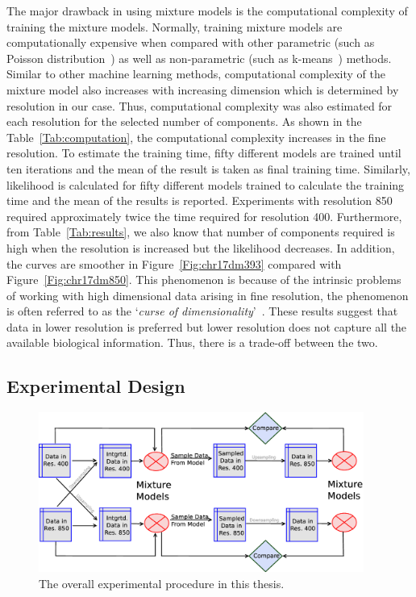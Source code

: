 The major drawback in using mixture models is the computational complexity of training the mixture models. Normally, training mixture models are computationally expensive when compared with other parametric (such as Poisson distribution~\cite{poission}) as well as non-parametric (such as k-means~\cite{kmeans, kmeans2}) methods. Similar to other machine learning methods, computational complexity of the mixture model also increases with increasing dimension which is determined by resolution in our case. Thus, computational complexity was also estimated for each resolution for the selected number of components. As shown in the Table~\ref{Tab:computation}, the computational complexity increases in the fine resolution. To estimate the training time, fifty different models are trained until ten iterations and the mean of the result is taken as final training time. Similarly, likelihood is calculated for fifty different models trained to calculate the training time and the mean of the results is reported. Experiments with resolution 850 required approximately twice the time required for resolution 400. Furthermore, from Table~\ref{Tab:results}, we also know that number of components required is high when the resolution is increased but the likelihood decreases. In addition, the curves are smoother in Figure~\ref{Fig:chr17dm393} compared with Figure~\ref{Fig:chr17dm850}. This phenomenon is because of the intrinsic problems of working with high dimensional data arising in fine resolution, the phenomenon is often referred to as the `\textit{curse of dimensionality}'~\cite{curse}. These results suggest that data in lower resolution is preferred but lower resolution does not capture all the available biological information. Thus, there is a trade-off between the two.

\subsection{Experimental Design}
\label{ss:experimentalprocedure}

\begin{figure}[h!]
\centering
\includegraphics[width=0.95\textwidth]{figures/process}
\caption[Experimental procedure]{The overall experimental procedure in this thesis.}\label{Fig:expmproc}
\end{figure}

